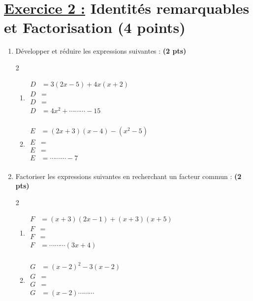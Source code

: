 \documentclass[12pt,a4paper]{article}
\begin{document}
\section*{\underline{Exercice 2 :} Identités remarquables et Factorisation (4 points)}

\begin{enumerate}

\item Développer et réduire les expressions suivantes : \textbf{(2 pts)}
 \begin{multicols}{2}
\setlength{\columnseprule}{0.1mm}
\begin{enumerate}
\item[]
\(
\begin{aligned}
D&=3(2x - 5) + 4x(x + 2)\\[0.5cm]
D&=\\[0.5cm]
D&=\\[0.5cm]
D&=4x^2 +\cdots\cdots\cdots - 15\\
\end{aligned}
\)
\item[]
\(
\begin{aligned}
E&=(2x + 3)(x - 4) - (x^2 - 5)\\[0.5cm]
E&=\\[0.5cm]
E&=\\[0.5cm]
E&=\cdots\cdots\cdots - 7\\
\end{aligned}
\)
\end{enumerate}
\end{multicols}

    \item Factoriser les expressions suivantes en recherchant un facteur commun : \textbf{(2 pts)}

\begin{multicols}{2}
\setlength{\columnseprule}{0.1mm}
\begin{enumerate}
\item[]
\(
\begin{aligned}
F&=(x + 3)(2x - 1) + (x + 3)(x + 5)\\[0.5cm]
F&=\\[0.5cm]
F&=\\[0.5cm]
F&=\cdots\cdots\cdots(3x + 4)\\
\end{aligned}
\)
\item[]
\(
\begin{aligned}
G&=(x - 2)^2 - 3(x - 2)\\[0.5cm]
G&=\\[0.5cm]
G&=\\[0.5cm]
G&=(x - 2)\cdots\cdots\cdots\\
\end{aligned}
\)
\end{enumerate}
\end{multicols}     
    
\end{enumerate}
\newpage
\end{document}
